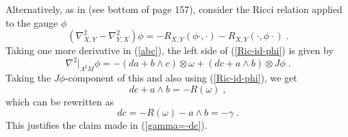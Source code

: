 \documentclass{amsart}
\newcommand{\na}{\nabla}
\begin{document}
Alternatively, as in \cite{AAD-AGAG} (see bottom of page 157), consider the Ricci relation applied to the gauge $\phi$
\begin{equation} \label{Ric-id-phi}
( \nabla^2_{X,Y} -  \nabla^2_{Y,X} )\phi = -R_{X,Y}(\phi\cdot, \cdot) -R_{X,Y}(\cdot, \phi\cdot) \; .
\end{equation}
Taking one more derivative in (\ref{abc}), the left side of (\ref{Ric-id-phi}) is given by 
$$\na ^2|_{\Lambda^2 M}\phi = - (da + b\wedge c)\otimes \omega + (dc  + a\wedge b)\otimes J\phi \; . $$
Taking the $J\phi$-component of this and also using (\ref{Ric-id-phi}), we get 
$$ dc + a \wedge b = -R(\omega) \; ,$$
which can be rewritten as
$$ dc = - R(\omega) - a\wedge b = - \gamma \; .$$
This justifies the claim made in (\ref{gamma=-dc}).

\vspace{0.2cm} 
\end{document}
